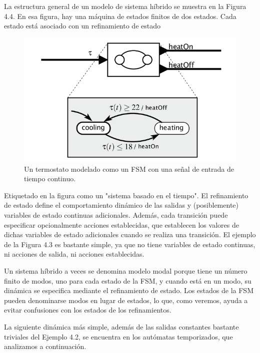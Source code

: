 La estructura general de un modelo de sistema híbrido se muestra en la Figura 4.4. En esa figura, hay una máquina de estados finitos de dos estados. Cada estado está asociado con un refinamiento de estado

\begin{figure}[H]
    \centering
    \includegraphics[width=0.5\linewidth]{4_4.1/image.png}

    \caption{Un termostato modelado como un FSM con una señal de entrada de tiempo continuo.}
    \label{Figura 4.2}
\end{figure}

Etiquetado en la figura como un "sistema basado en el tiempo". El refinamiento de estado define el comportamiento dinámico de las salidas y (posiblemente) variables de estado continuas adicionales. Además, cada transición puede especificar opcionalmente acciones establecidas, que establecen los valores de dichas variables de estado adicionales cuando se realiza una transición. El ejemplo de la Figura 4.3 es bastante simple, ya que no tiene variables de estado continuas, ni acciones de salida, ni acciones establecidas.

Un sistema híbrido a veces se denomina modelo modal porque tiene un número finito de modos, uno para cada estado de la FSM, y cuando está en un modo, su dinámica se especifica mediante el refinamiento de estado. Los estados de la FSM pueden denominarse modos en lugar de estados, lo que, como veremos, ayuda a evitar confusiones con los estados de los refinamientos.

La siguiente dinámica más simple, además de las salidas constantes bastante triviales del Ejemplo 4.2, se encuentra en los autómatas temporizados, que analizamos a continuación.
